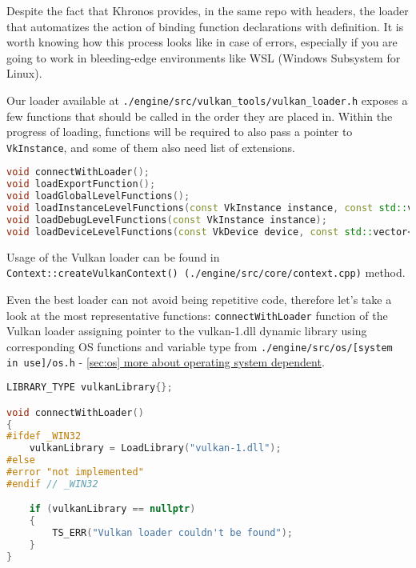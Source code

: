 Despite the fact that Khronos provides, in the same repo with headers, the loader that automatizes the action of binding function declarations with definition. It is worth knowing how this process looks like in case of errors, especially if you are going to work in bleeding-edge environments like WSL (Windows Subsystem for Linux).

Our loader available at \texttt{./engine/src/vulkan\_tools/vulkan\_loader.h} exposes a few functions that should be called in the order they are placed in. Within the progress of loading, functions will be required to also pass a pointer to \texttt{VkInstance}, and some of them also need list of extensions.
\begin{lstlisting}[language=c++, caption=Vulkan loader header (./engine/src/vulkan\_tools/vulkan\_loader.h)]
void connectWithLoader();
void loadExportFunction();
void loadGlobalLevelFunctions();
void loadInstanceLevelFunctions(const VkInstance instance, const std::vector<std::string>& vulkanInstanceExtensions);
void loadDebugLevelFunctions(const VkInstance instance);
void loadDeviceLevelFunctions(const VkDevice device, const std::vector<std::string>& enabledVulkanDeviceExtensions);
\end{lstlisting}

Usage of the Vulkan loader can be found in \\
\texttt{Context::createVulkanContext() (./engine/src/core/context.cpp)} method.

Even the best loader can not avoid being repetitive code, therefore let's take a look at the most representative functions:
\texttt{connectWithLoader} function of the Vulkan loader assigning pointer to the vulkan-1.dll dynamic library using corresponding OS functions and variable type from \texttt{./engine/src/os/[system in use]/os.h} -  \hyperref[sec:os]{\ref*{sec:os} more about operating system dependent}.
\begin{lstlisting}[language=c++, caption=Connecting with the Vulkan-1.dll (./engine/src/vulkan\_tools/vulkan\_loader.cpp)]
LIBRARY_TYPE vulkanLibrary{};

void connectWithLoader()
{
#ifdef _WIN32
    vulkanLibrary = LoadLibrary("vulkan-1.dll");
#else
#error "not implemented"
#endif // _WIN32

    if (vulkanLibrary == nullptr)
    {
        TS_ERR("Vulkan loader couldn't be found");
    }
}
\end{lstlisting}

